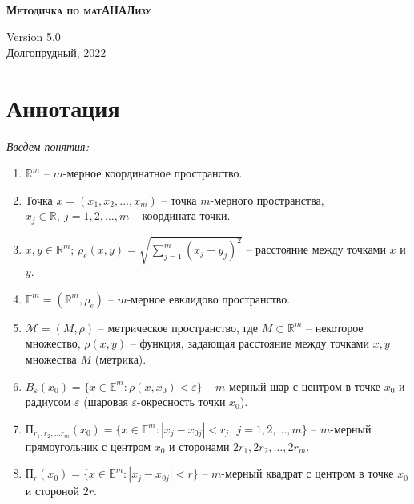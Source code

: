 \documentclass[a4paper,12pt]{article} %
\begin{document}
	
	
	\begin{titlepage}
		\begin{center}
			\
			\vfill
			
			{\LARGE \textsc{\textbf{Методичка по матАНАЛизу}}}
			
			\vspace{2em}
			
			\vfill
			
			Version 5.0\\
			Долгопрудный, 2022
		\end{center}
	\end{titlepage}
	

	
	\section{Аннотация}
	
	\noindent \textit{Введем понятия:}
	
	\begin{enumerate}
		\item $\mathbb{R}^m$ -- $m$-мерное координатное пространство.
		\item Точка $x = (x_1, x_2, \dots, x_m)$ -- точка $m$-мерного пространства, ~ \\ $x_j \in \mathbb{R}, ~
		j = 1, 2, \dots, m$ -- координата точки.
		\item $x, y \in \mathbb{R}^m$; $\rho_e(x, y) = \sqrt{\sum\limits_{j = 1}^m (x_j - y_j)^2}$ -- расстояние между точками $x$ и $y$.
		\item $\mathbb{E}^m = (\mathbb{R}^m, \rho_e)$ -- $m$-мерное евклидово пространство.
		\item $\mathscr{M} = (M, \rho)$ -- метрическое пространство, где $M \subset \mathbb{R}^m$ -- некоторое множество, $\rho(x, y)$ -- функция, задающая расстояние между точками $x, y$ множества $M$ (метрика).
		\item $B_{\varepsilon}(x_0) = \{x \in \mathbb{E}^m : \rho(x, x_0) < \varepsilon \}$ -- $m$-мерный шар с центром в точке $x_0$ и радиусом $\varepsilon$ (шаровая $\varepsilon$-окресность точки $x_0$).
		\item $\text{П}_{r_1, r_2, \dots r_m}(x_0) = \{ x \in \mathbb{E}^m : |x_j - x_{0j}| < r_j, ~ j = 1, 2, \dots, m \}$ -- $m$-мерный прямоугольник с центром $x_0$ и сторонами $2r_1, 2r_2, \dots, 2r_m$.
		\item $\text{П}_r(x_0) = \{ x \in \mathbb{E}^m : |x_j - x_{0j}| < r \}$ -- $m$-мерный квадрат с центром в точке $x_0$ и стороной $2r$.
	\end{enumerate}
	
\end{document}
